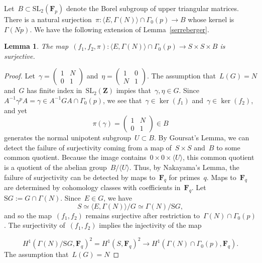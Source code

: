 \documentclass[10pt]{amsart}
\def\Gbox{G^{\square}}
\def\Gbox{\mathrm{S}G}
\def\F{\mathbf{F}}
\def\Z{\mathbf{Z}}
\newtheorem{lemma}[subsubsection]{Lemma}
\theoremstyle{remark}
\numberwithin{equation}{subsection}
\def\numequation{\addtocounter{subsubsection}{1}\begin{equation}}
\def\SL{\mathrm{SL}}
\begin{document}
Let~$B \subset \SL_2(\F_p)$ denote the Borel subgroup of upper triangular matrices.
There is a natural surjection~$\pi: \langle E, \Gamma(N) \rangle \cap \Gamma_0(p) \rightarrow B$
whose kernel is~$\Gamma(Np)$. 
We have the following extension of Lemma~\ref{serreberger}.

\begin{lemma}\label{effort} The map~$(f_1,f_2,\pi): \langle E, \Gamma(N)\rangle \cap \Gamma_0(p) \rightarrow S \times S \times B$
is surjective.
\end{lemma}






\begin{proof} Let~$\gamma = \left( \begin{matrix} 1 & N \\ 0 & 1 \end{matrix}  \right)$ and~$\eta = \left( \begin{matrix} 1 & 0 \\ N& 1 \end{matrix}  \right)$. The assumption that~$L(G) = N$
and~$G$ has finite index in~$\SL_2(\Z)$ impies that~$\gamma, \eta \in G$. 
Since~$A^{-1} \gamma^p A = \gamma \in A^{-1} G A \cap \Gamma_0(p)$, we see that~$\gamma \in \ker(f_1)$ and~$\gamma \in \ker(f_2)$, and yet
$$\pi(\gamma) = \left( \begin{matrix} 1 & N \\ 0 & 1 \end{matrix}  \right) \in B$$
generates the normal unipotent subgroup~$U \subset B$. 
By Goursat's Lemma, we can detect the failure of surjectivity coming from a map of~$S \times S$ and~$B$ to some common quotient.
Because the image contains~$0 \times 0 \times \langle U \rangle$, this common quotient is  a quotient of the abelian group~$B/\langle U \rangle$.
 Thus, by Nakayama's Lemma, the failure of surjectivity can be detected by maps to~$\F_q$ for 
 primes~$q$.
 Maps to~$\F_q$ are determined by cohomology classes with coefficients in~$\F_q$. 
 Let~$\Gbox:=G \cap \Gamma(N)$. Since~$E \in G$, we have
 $$S \simeq \langle E,\Gamma(N) \rangle/G
 \simeq \Gamma(N)/\Gbox,$$
 and so the map~$(f_1,f_2)$ remains surjective after restriction
  to~$\Gamma(N) \cap \Gamma_0(p)$.
 The surjectivity of~$(f_1,f_2)$ implies the injectivity of the map
 \numequation \label{beforeupgrade}
 H^1(\Gamma(N)/\Gbox,\F_q)^{2} = H^1(S,\F_q)^2  \rightarrow 
H^1(\Gamma(N) \cap \Gamma_0(p),\F_q).
\end{equation}
The assumption that~$L(G)=N$ 

\end{proof}
\end{document}
